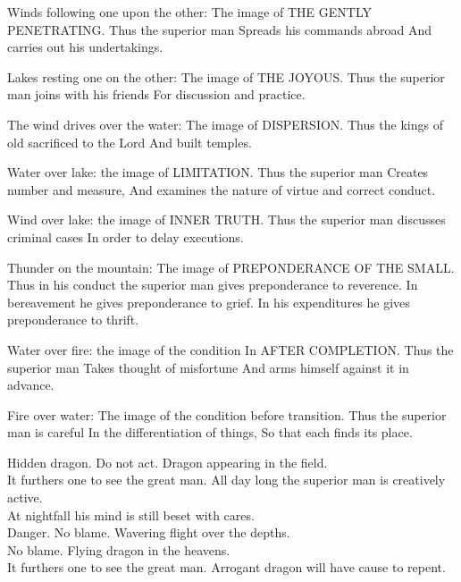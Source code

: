 {Winds following one upon the other:
 The image of THE GENTLY PENETRATING.
 Thus the superior man
 Spreads his commands abroad
 And carries out his undertakings.}

{Lakes resting one on the other:
 The image of THE JOYOUS.
 Thus the superior man joins with his friends
 For discussion and practice.}

{The wind drives over the water:
 The image of DISPERSION.
 Thus the kings of old sacrificed to the Lord
 And built temples.}

{Water over lake: the image of
 LIMITATION.
 Thus the superior man
 Creates number and measure,
 And examines the nature of virtue and correct conduct.}

{Wind over lake: the image of INNER
 TRUTH.
 Thus the superior man discusses criminal cases
 In order to delay executions.}

{Thunder on the mountain:
 The image of PREPONDERANCE OF THE
 SMALL.
 Thus in his conduct the superior man gives preponderance to reverence.
 In bereavement he gives preponderance to grief.
 In his expenditures he gives preponderance to thrift.}

{Water over fire: the image of the condition
 In AFTER COMPLETION.
 Thus the superior man
 Takes thought of misfortune
 And arms himself against it in advance.}

{Fire over water:
 The image of the condition before transition.
 Thus the superior man is careful
 In the differentiation of things,
 So that each finds its place.}

\endgroup
\begingroup

\def\mk#1#2#3#4#5#6#7{
  \expandafter\gdef\csname hexagram#1/line1/comment\endcsname{#2}
  \expandafter\gdef\csname hexagram#1/line2/comment\endcsname{#3}
  \expandafter\gdef\csname hexagram#1/line3/comment\endcsname{#4}
  \expandafter\gdef\csname hexagram#1/line4/comment\endcsname{#5}
  \expandafter\gdef\csname hexagram#1/line5/comment\endcsname{#6}
  \expandafter\gdef\csname hexagram#1/line6/comment\endcsname{#7}
}

\mk {1}
{Hidden dragon. Do not act.}
{Dragon appearing in the field.\\
 It furthers one to see the great man.}
{All day long the superior man is creatively active.\\
 At nightfall his mind is still beset with cares.\\
 Danger. No blame.}
{Wavering flight over the depths.\\
 No blame.}
{Flying dragon in the heavens.\\
 It furthers one to see the great man.}
{Arrogant dragon will have cause to repent.}

